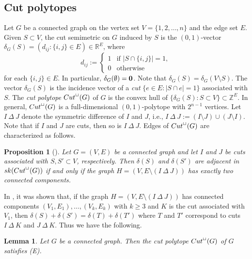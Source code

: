 \documentclass[10pt,a4paper]{amsart}
\newtheorem{prop}[thm]{Proposition}
\newtheorem{lemma}[thm]{Lemma}
\numberwithin{thm}{section}
\numberwithin{equation}{section}
\def\NZQ{\mathbb}               %
\def\ZZ{{\NZQ Z}}
\def\RR{{\NZQ R}}
\begin{document}
\subsection{Cut polytopes}
Let $G$ be a connected graph on the vertex set $V=\{1,2,\dots,n\}$
and the edge set $E$. 
Given $S\subset V$, the cut semimetric on $G$ induced by $S$ is the $(0,1)$-vector $\delta_G(S)=(d_{ij} : \{i,j\}\in E) \in \RR^{E}$, where
$$
d_{ij}
:=
\left\{
\begin{array}{cl}
1     & \mbox{if } |S\cap \{i,j\}|=1, \\
0     & \mbox{otherwise } 
\end{array}
\right.
$$
for each $\{i,j\}\in E$.
In particular, $\delta_G(\emptyset) = {\bf 0}$.
Note that $\delta_G(S) = \delta_G(V \setminus S)$.
The vector $\delta_G(S)$ is the incidence vector
of a {\it cut} $\{e \in E : |S\cap e|=1 \}$ associated with $S$.
The \textit{cut polytope} ${\rm Cut}^\Box(G)$ of $G$ is the convex hull of $\{\delta_G(S) : S \subset V\} \subset  \ZZ^E$.
In general, ${\rm Cut}^\Box(G)$ is a full-dimensional $(0,1)$-polytope with $2^{n-1}$ vertices.
Let $I\ \Delta \ J$ denote the symmetric difference of $I$ and $J$, i.e., 
$I\ \Delta\ J := (I \setminus J ) \cup  (J\setminus I)$.
Note that if $I$ and $J$ are cuts, then so is $I \ \Delta \ J$.
Edges of ${\rm Cut}^\Box(G)$ are characterized as follows.

\begin{prop}[{\cite[Theorem 4.1]{BM}}]
\label{mmprop}
    Let $G=(V,E)$ be a connected graph and let 
    $I$ and $J$ be cuts associated with $S, S' \subset V$, respectively.
    Then $\delta(S)$ and $\delta(S')$ are adjacent in ${\rm sk}({\rm Cut}^\Box(G))$
    if and only if 
   the graph $H=(V, E \setminus (I \ \Delta \ J))$
has exactly two connected components.
\end{prop}

In \cite[Proof of Theorem 4.1]{BM},
it was shown that,
if the graph $H=(V, E \setminus (I \ \Delta \ J))$ has connected components 
$(V_1,E_1), \dots, (V_k,E_k)$ with $k \ge 3$
and $K$ is the cut associated with $V_1$,
then 
$\delta(S) + \delta(S') = \delta(T) + \delta(T') $
where $T$ and $T'$ correspond to cuts
$I \ \Delta \ K$ and $J \ \Delta \ K$.
Thus we have the following.

\begin{lemma}
    Let $G$ be a connected graph. Then the cut polytope ${\rm Cut}^\Box(G)$ of $G$ satisfies (E).
\end{lemma}
\end{document}
